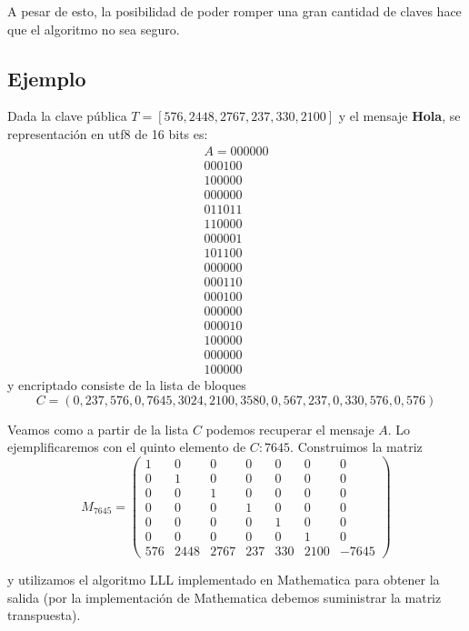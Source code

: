 \documentclass[12pt]{article}
\begin{document}
A pesar de esto, la posibilidad de poder romper una gran cantidad de claves hace que el algoritmo no sea seguro.

\subsection{Ejemplo}

Dada la clave pública $T = [576, 2448, 2767, 237, 330, 2100]$ y el mensaje \textbf{Hola}, se representación en utf8 de 16 bits es: \begin{equation}
\begin{split}
A = 000000\\
000100\\
100000\\
000000\\
011011\\
110000\\
000001\\
101100\\
000000\\
000110\\
000100\\
000000\\
000010\\
100000\\
000000\\
100000
\end{split}\end{equation} y encriptado consiste de la lista de bloques $$C = (0, 237, 576, 0, 7645, 3024, 2100, 3580, 0, 567, 237, 0, 330, 576, 0, 576)$$

Veamos como a partir de la lista $C$ podemos recuperar el mensaje $A$. Lo ejemplificaremos con el quinto elemento de $C: 7645$. Construimos la matriz \begin{equation} M_{7645} = \left( \begin{array}{ccccccc}
1 & 0 & 0 & 0 & 0 & 0 & 0 \\ 
0 & 1 & 0 & 0 & 0 & 0 & 0 \\
0 & 0 & 1 & 0 & 0 & 0 & 0 \\
0 & 0 & 0 & 1 & 0 & 0 & 0 \\
0 & 0 & 0 & 0 & 1 & 0 & 0 \\
0 & 0 & 0 & 0 & 0 & 1 & 0 \\
576 & 2448 & 2767 & 237 & 330 & 2100 & -7645 
\end{array} \right) 
\end{equation}

y utilizamos el algoritmo LLL implementado en Mathematica para obtener la salida (por la implementación de Mathematica debemos suministrar la matriz transpuesta).
\end{document}
